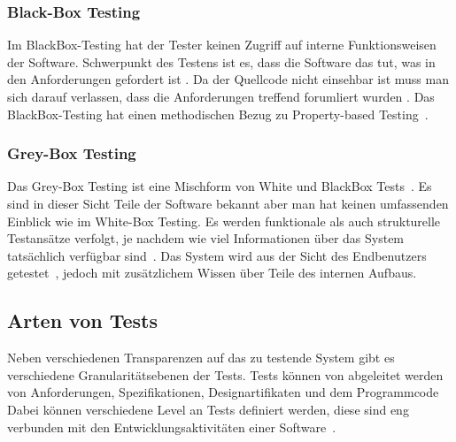 \subsubsection{Black-Box Testing}

Im BlackBox-Testing hat der Tester keinen Zugriff auf interne Funktionsweisen der Software.
Schwerpunkt des Testens ist es, dass die Software das tut, was in den Anforderungen gefordert ist \cite[vgl. Specification-Based Testing]{software-testing-craftmans}.
Da der Quellcode nicht einsehbar ist muss man sich darauf verlassen, dass die Anforderungen treffend forumliert wurden \cite[vgl.]{testmanagment}.
Das BlackBox-Testing hat einen methodischen Bezug zu Property-based Testing~\cite{property-based-testing}.

\subsubsection{Grey-Box Testing}

Das Grey-Box Testing ist eine Mischform von White und BlackBox Tests~\cite[vgl.]{testmanagment}.
Es sind in dieser Sicht Teile der Software bekannt aber man hat keinen umfassenden Einblick wie im White-Box Testing.
Es werden funktionale als auch strukturelle Testansätze verfolgt, je nachdem wie viel Informationen über das System tatsächlich 
verfügbar sind~\cite[vgl.]{graybox}.
Das System wird aus der Sicht des Endbenutzers getestet~\cite[vgl.]{testmanagment}, jedoch mit zusätzlichem Wissen über Teile des internen Aufbaus.

\subsection{Arten von Tests}

Neben verschiedenen Transparenzen auf das zu testende System gibt es verschiedene Granularitätsebenen der Tests.
Tests können von abgeleitet werden von Anforderungen, Spezifikationen, Designartifikaten und dem Programmcode~\cite[vgl. 1.1.1 Testing Levels Based on Software Activity]{software-testing}
Dabei können verschiedene Level an Tests definiert werden, diese sind eng verbunden mit den Entwicklungsaktivitäten einer Software~\cite[vgl. 1.1.1]{software-testing}.

